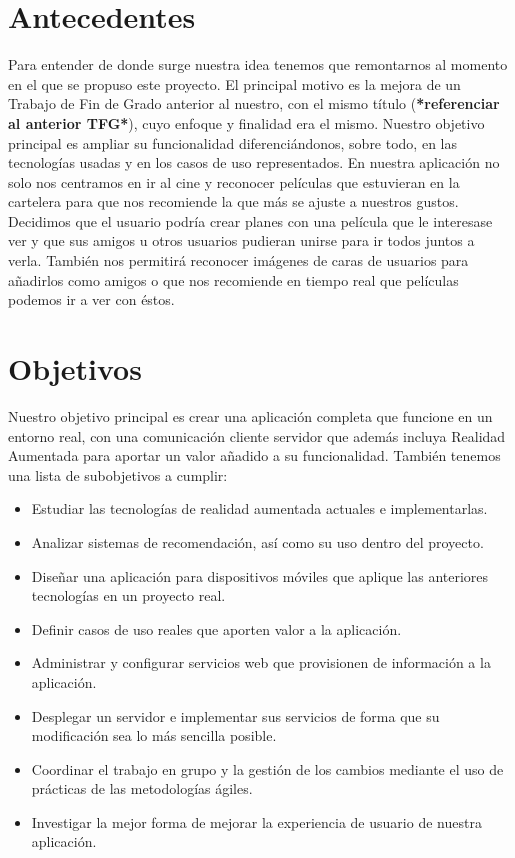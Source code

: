 \section{Antecedentes}
\label{makereference1.1}
\begin{flushleft}
    Para entender de donde surge nuestra idea tenemos que remontarnos al momento en el que se propuso este proyecto.
    El principal motivo es la mejora de un Trabajo de Fin de Grado anterior
    al nuestro, con el mismo título (\textbf{*referenciar al anterior TFG*}), cuyo enfoque y finalidad era el mismo. Nuestro objetivo principal es 
    ampliar su funcionalidad diferenciándonos, sobre todo, en las tecnologías usadas y 
    en los casos de uso representados.
    En nuestra aplicación no solo nos centramos en ir al cine y reconocer películas que estuvieran en la cartelera
    para que nos recomiende la que más se ajuste a nuestros gustos. Decidimos que el usuario podría crear planes con
    una película que le interesase ver y que sus amigos u otros usuarios pudieran unirse para ir todos juntos a verla.
    También nos permitirá reconocer imágenes de caras de usuarios para añadirlos como amigos o que nos recomiende en tiempo real
    que películas podemos ir a ver con éstos.
\end{flushleft}
\section{Objetivos}
\label{makereference1.2}
Nuestro objetivo principal es crear una aplicación completa que funcione en un entorno real, con una comunicación cliente servidor que además 
incluya Realidad Aumentada para aportar un valor añadido a su funcionalidad.
También tenemos una lista de subobjetivos a cumplir:
\begin{itemize}  
    \item Estudiar las tecnologías de realidad aumentada actuales e implementarlas.
    \item Analizar sistemas de recomendación, así como su uso dentro del proyecto.
    \item Diseñar una aplicación para dispositivos móviles que aplique las anteriores tecnologías en un proyecto real.
    \item Definir casos de uso reales que aporten valor a la aplicación.
    \item Administrar y configurar servicios web que provisionen de información a la aplicación.
    \item Desplegar un servidor e implementar sus servicios de forma que su modificación sea lo más sencilla posible.
    \item Coordinar el trabajo en grupo y la gestión de los cambios mediante el uso de prácticas de las metodologías ágiles.
    \item Investigar la mejor forma de mejorar la experiencia de usuario de nuestra aplicación.
\end{itemize}

